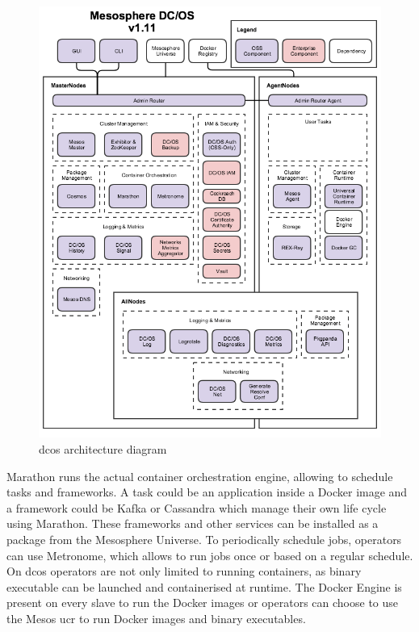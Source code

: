 \begin{figure}
    \centering
    \includegraphics[width=1\columnwidth]{images/dcos-arch}
    \caption{\gls{dcos} architecture diagram\cite{dcos_arch}}
    \label{fig:dcos-arch}
\end{figure}

Marathon\cite{marathon} runs the actual container orchestration engine, allowing to schedule tasks and frameworks. A task could be an application inside a Docker image and a framework could be Kafka\cite{kafka} or Cassandra\cite{cassandra} which manage their own life cycle using Marathon. These frameworks and other services can be installed as a package from the Mesosphere Universe\cite{universe}. To periodically schedule jobs, operators can use Metronome\cite{metronome}, which allows to run jobs once or based on a regular schedule. On \gls{dcos} operators are not only limited to running containers, as binary executable can be launched and containerised at runtime. The Docker Engine is present on every slave to run the Docker images or operators can choose to use the Mesos \gls{ucr}\cite{ucr} to run Docker images and binary executables.

